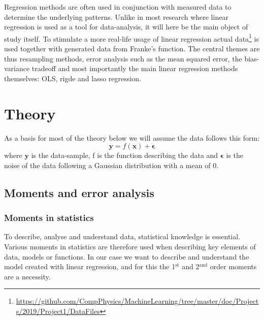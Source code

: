 \documentclass[uio,jmp,amsmath,amssymb,reprint,nofootinbib]{revtex4-1}
\numberwithin{equation}{section}
\begin{document}
Regression methods are often used in conjunction with measured data to determine the underlying patterns. Unlike in most research where linear regression is used as a tool for data-analysis, it will here be the main object of study itself. To stimulate a more real-life usage of linear regression actual data\footnote{\url{https://github.com/CompPhysics/MachineLearning/tree/master/doc/Projects/2019/Project1/DataFiles}} is used together with generated data from  Franke's function. The central themes are thus resampling methods, error analysis such as the mean squared error, the bias-variance tradeoff and most importantly the main linear regression methods themselves: OLS, rigde and lasso regression.



\section{Theory}\label{sec:Theory}

As a basis for most of the theory below we will assume the data follows this form:
\begin{equation}\label{eq:01}
    \bm{y} = f(\bm{x}) + \bm{\epsilon}
\end{equation}
where \(\bm{y}\) is the data-sample, f is the function describing the data and \(\bm{\epsilon}\) is the noise of the data following a Gaussian distribution with a mean of 0.

\subsection{Moments and error analysis}

\subsubsection{Moments in statistics}

To describe, analyse and understand data, statistical knowledge is essential. Various moments in statistics are therefore used when describing key elements of data, models or functions. In our case we want to describe and understand the model created with linear regression, and for this the 1\(^\text{st}\) and 2\(^\text{and}\) order moments are a necessity.
\end{document}
